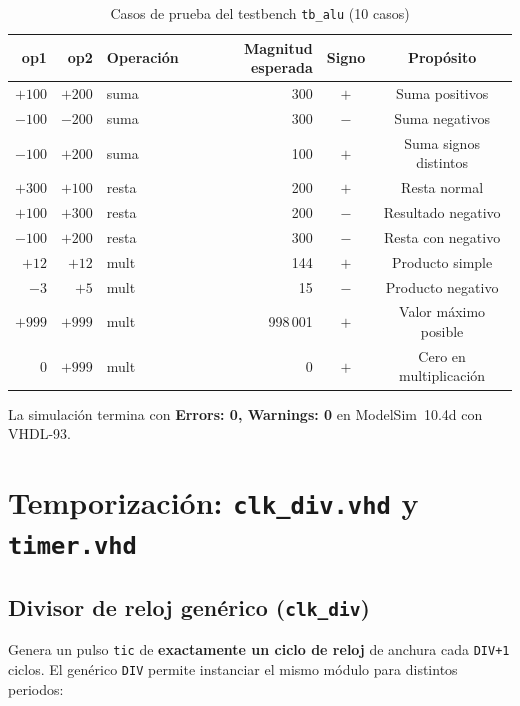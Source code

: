 \documentclass[memoria_final]{subfiles}
\begin{document}
\begin{table}[H]
  \centering
  \caption{Casos de prueba del testbench \texttt{tb\_alu} (10 casos)}
  \begin{tabular}{rrlrcc}
    \toprule
    \textbf{op1} & \textbf{op2} & \textbf{Operación} &
    \textbf{Magnitud esperada} & \textbf{Signo} &
    \textbf{Propósito} \\
    \midrule
    $+100$ & $+200$ & suma  & 300     & $+$ & Suma positivos \\
    $-100$ & $-200$ & suma  & 300     & $-$ & Suma negativos \\
    $-100$ & $+200$ & suma  & 100     & $+$ & Suma signos distintos \\
    $+300$ & $+100$ & resta & 200     & $+$ & Resta normal \\
    $+100$ & $+300$ & resta & 200     & $-$ & Resultado negativo \\
    $-100$ & $+200$ & resta & 300     & $-$ & Resta con negativo \\
    $+12$  & $+12$  & mult  & 144     & $+$ & Producto simple \\
    $-3$   & $+5$   & mult  & 15      & $-$ & Producto negativo \\
    $+999$ & $+999$ & mult  & 998\,001 & $+$ & Valor máximo posible \\
    $0$    & $+999$ & mult  & 0       & $+$ & Cero en multiplicación \\
    \bottomrule
  \end{tabular}
\end{table}

\noindent La simulación termina con \textbf{Errors: 0, Warnings: 0} en
ModelSim~10.4d con VHDL-93.
\FloatBarrier

\section{Temporización: \texttt{clk\_div.vhd} y \texttt{timer.vhd}}

\subsection{Divisor de reloj genérico (\texttt{clk\_div})}

Genera un pulso \texttt{tic} de \textbf{exactamente un ciclo de reloj} de
anchura cada \texttt{DIV+1} ciclos. El genérico \texttt{DIV} permite
instanciar el mismo módulo para distintos periodos:
\end{document}
